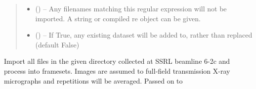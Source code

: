 \documentclass[letterpaper,10pt,english]{sphinxmanual}
\begin{document}
\begin{fulllineitems}
\begin{quote}
\begin{description}
\begin{itemize}
\item {} 
 (\sphinxstyleliteralemphasis{, }) -- Any filenames matching this regular expression will not be
imported. A string or compiled re object can be given.

\item {} 
 (\sphinxstyleliteralemphasis{, }) -- If True, any existing dataset will be added to, rather
than replaced (default False)

\end{itemize}

\end{description}\end{quote}

\end{fulllineitems}


\begin{fulllineitems}
\label{\detokenize{xanespy:xanespy.importers.import_ssrl_frameset}}
Import all files in the given directory collected at SSRL beamline
6-2c and process into framesets. Images are assumed to full-field
transmission X-ray micrographs and repetitions will be
averaged. Passed on to 

\end{fulllineitems}

\end{document}
